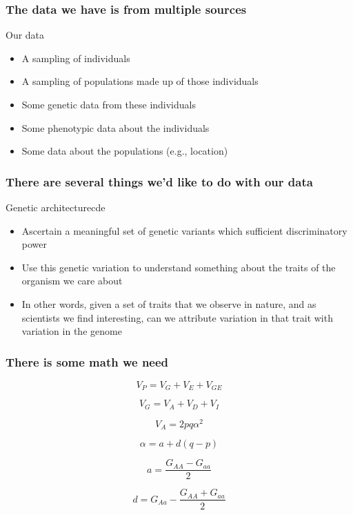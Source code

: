 \begin{frame}
\frametitle{The data we have is from multiple sources}
\begin{block}{Our data}
\begin{itemize}
\item{A sampling of individuals}
\item{A sampling of populations made up of those individuals}
\item{Some genetic data from these individuals}
\item{Some phenotypic data about the individuals}
\item{Some data about the populations (e.g., location)}
\end{itemize}

\end{block}\end{frame}

\begin{frame}
\frametitle{There are several things we'd like to do with our data}

\begin{block}{Genetic architecture}cde
\begin{itemize}
\item{Ascertain a meaningful set of genetic variants which sufficient
discriminatory power}
\item{Use this genetic variation to understand something about the 
traits of the organism we care about}
\item{In other words, given a set of traits that we observe in nature, and as
scientists we find interesting, can we attribute variation in that trait with
variation in the genome}
\end{itemize}
\end{block}
\end{frame}

\begin{frame}
\frametitle{There is some math we need}
\begin{block}{}
\begin{equation}
\label{eqn:V_P}
V_P = V_G + V_E + V_{GE}
\end{equation}

\begin{equation}
\label{eqn:V_G}
V_G = V_A + V_D + V_I
\end{equation}

\begin{equation}
\label{eqn:V_A}
V_A = 2pq\alpha^2
\end{equation}

\begin{equation}
\label{eqn:alpha}
\alpha = a + d(q-p)
\end{equation}

\begin{equation}
\label{eqn:a}
a = \frac{G_{AA}-G_{aa}}{2}
\end{equation}

\begin{equation}
\label{eqn:d}
d = G_{Aa} - \frac{G_{AA}+G_{aa}}{2}
\end{equation}

\end{block}{}
\end{frame}

